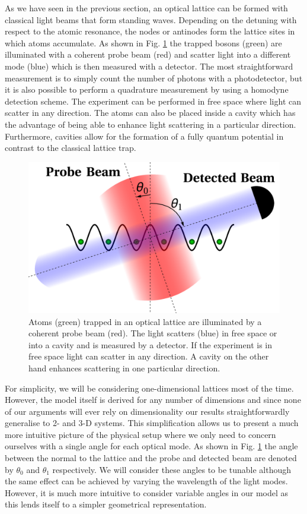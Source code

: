 As we have seen in the previous section, an optical lattice can be
formed with classical light beams that form standing waves. Depending
on the detuning with respect to the atomic resonance, the nodes or
antinodes form the lattice sites in which atoms accumulate. As shown
in Fig. \ref{fig:LatticeDiagram} the trapped bosons (green) are
illuminated with a coherent probe beam (red) and scatter light into a
different mode (blue) which is then measured with a detector. The most
straightforward measurement is to simply count the number of photons
with a photodetector, but it is also possible to perform a quadrature
measurement by using a homodyne detection scheme. The experiment can
be performed in free space where light can scatter in any
direction. The atoms can also be placed inside a cavity which has the
advantage of being able to enhance light scattering in a particular
direction. Furthermore, cavities allow for the formation of a fully
quantum potential in contrast to the classical lattice trap.

\begin{figure}[htbp!]
  \centering
  \includegraphics[width=1.0\textwidth]{LatticeDiagram}
  \caption[Experimental Setup]{Atoms (green) trapped in an optical
    lattice are illuminated by a coherent probe beam (red). The light
    scatters (blue) in free space or into a cavity and is measured by
    a detector. If the experiment is in free space light can scatter
    in any direction. A cavity on the other hand enhances scattering
    in one particular direction.}
  \label{fig:LatticeDiagram}
\end{figure}

For simplicity, we will be considering one-dimensional lattices most
of the time. However, the model itself is derived for any number of
dimensions and since none of our arguments will ever rely on
dimensionality our results straightforwardly generalise to 2- and 3-D
systems. This simplification allows us to present a much more
intuitive picture of the physical setup where we only need to concern
ourselves with a single angle for each optical mode. As shown in
Fig. \ref{fig:LatticeDiagram} the angle between the normal to the
lattice and the probe and detected beam are denoted by $\theta_0$ and
$\theta_1$ respectively. We will consider these angles to be tunable
although the same effect can be achieved by varying the wavelength of
the light modes. However, it is much more intuitive to consider
variable angles in our model as this lends itself to a simpler
geometrical representation.

